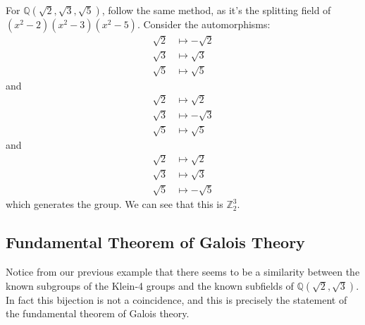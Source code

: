   \begin{example}
    For $\mathbb{Q}(\sqrt{2}, \sqrt{3}, \sqrt{5})$, follow the same method, as it's the splitting field of $(x^2 - 2)(x^2 - 3)(x^2 - 5)$. Consider the automorphisms:
    \begin{align}
      \sqrt{2} &\mapsto -\sqrt{2} \\
      \sqrt{3} &\mapsto \sqrt{3} \\
      \sqrt{5} &\mapsto \sqrt{5}
    \end{align}
    and
    \begin{align}
      \sqrt{2} &\mapsto \sqrt{2} \\
      \sqrt{3} &\mapsto -\sqrt{3} \\
      \sqrt{5} &\mapsto \sqrt{5}
    \end{align}
    and
    \begin{align}
      \sqrt{2} &\mapsto \sqrt{2} \\
      \sqrt{3} &\mapsto \sqrt{3} \\
      \sqrt{5} &\mapsto -\sqrt{5}
    \end{align}
    which generates the group. We can see that this is $\mathbb{Z}_2^3$. 
  \end{example}

\subsection{Fundamental Theorem of Galois Theory}

  Notice from our previous example that there seems to be a similarity between the known subgroups of the Klein-4 groups and the known subfields of $\mathbb{Q}(\sqrt{2}, \sqrt{3})$. In fact this bijection is not a coincidence, and this is precisely the statement of the fundamental theorem of Galois theory. 

